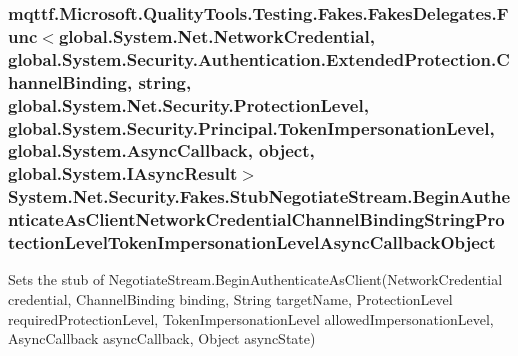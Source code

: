 \hypertarget{class_system_1_1_net_1_1_security_1_1_fakes_1_1_stub_negotiate_stream_a1953533a6263475648a88e5ae7f9f8db}{
\subsubsection[{Begin\-Authenticate\-As\-Client\-Network\-Credential\-Channel\-Binding\-String\-Protection\-Level\-Token\-Impersonation\-Level\-Async\-Callback\-Object}]{\setlength{\rightskip}{0pt plus 5cm}mqttf.\-Microsoft.\-Quality\-Tools.\-Testing.\-Fakes.\-Fakes\-Delegates.\-Func$<$global.\-System.\-Net.\-Network\-Credential, global.\-System.\-Security.\-Authentication.\-Extended\-Protection.\-Channel\-Binding, string, global.\-System.\-Net.\-Security.\-Protection\-Level, global.\-System.\-Security.\-Principal.\-Token\-Impersonation\-Level, global.\-System.\-Async\-Callback, object, global.\-System.\-I\-Async\-Result$>$ System.\-Net.\-Security.\-Fakes.\-Stub\-Negotiate\-Stream.\-Begin\-Authenticate\-As\-Client\-Network\-Credential\-Channel\-Binding\-String\-Protection\-Level\-Token\-Impersonation\-Level\-Async\-Callback\-Object}}\label{class_system_1_1_net_1_1_security_1_1_fakes_1_1_stub_negotiate_stream_a1953533a6263475648a88e5ae7f9f8db}


Sets the stub of Negotiate\-Stream.\-Begin\-Authenticate\-As\-Client(\-Network\-Credential credential, Channel\-Binding binding, String target\-Name, Protection\-Level required\-Protection\-Level, Token\-Impersonation\-Level allowed\-Impersonation\-Level, Async\-Callback async\-Callback, Object async\-State)

